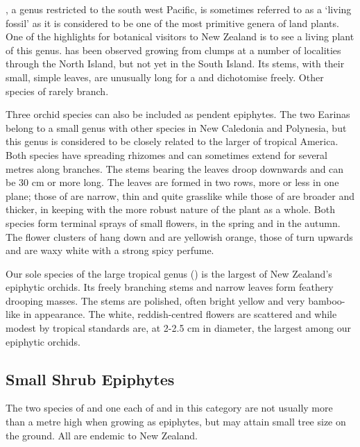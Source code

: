 , a genus restricted to the south west Pacific, is sometimes referred to as a `living fossil' as it is considered to be one of the most primitive genera of land plants.
One of the highlights for botanical visitors to New Zealand is to see a living plant of this genus.  has been observed growing from  clumps at a number of localities through the North Island, but not yet in the South Island.
Its stems, with their small, simple leaves, are unusually long for a  and dichotomise freely.
Other species of  rarely branch.

Three orchid species can also be included as pendent epiphytes.
The two Earinas belong to a small genus with other species in New Caledonia and Polynesia, but this genus is considered to be closely related to the larger  of tropical America.
Both species have spreading rhizomes and can sometimes extend for several metres along branches.
The stems bearing the leaves droop downwards and can be 30 cm or more long.
The leaves are formed in two rows, more or less in one plane; those of  are narrow, thin and quite grasslike while those of  are broader and thicker, in keeping with the more robust nature of the plant as a whole.
Both species form terminal sprays of small flowers,  in the spring and  in the autumn.
The flower clusters of  hang down and are yellowish orange, those of  turn upwards and are waxy white with a strong spicy perfume.

Our sole species of the large tropical genus  () is the largest of New Zealand's epiphytic orchids.
Its freely branching stems and narrow leaves form feathery drooping masses.
The stems are polished, often bright yellow and very bamboo-like in appearance.
The white, reddish-centred flowers are scattered and while modest by tropical standards are, at 2-2.5 cm in diameter, the largest among our epiphytic orchids.

\subsection{Small Shrub Epiphytes}

The two species of  and one each of  and  in this category are not usually more than a metre high when growing as epiphytes, but may attain small tree size on the ground.
All are endemic to New Zealand.

